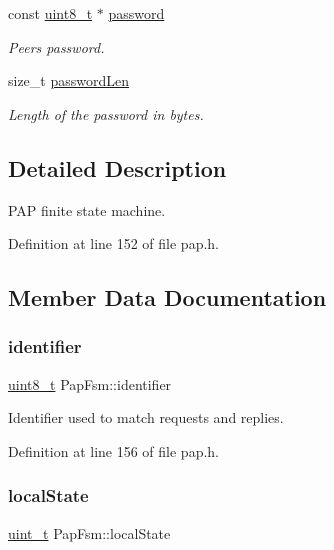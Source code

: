 \begin{DoxyCompactItemize}
const \hyperlink{stdint_8h_aba7bc1797add20fe3efdf37ced1182c5}{uint8\+\_\+t} $\ast$ \hyperlink{structPapFsm_ae09f94531c2c998e501561504c407aa3}{password}
\begin{DoxyCompactList}\small\item\em Peer\textquotesingle{}s password. \end{DoxyCompactList}\item 
size\+\_\+t \hyperlink{structPapFsm_aca5089d6f6410e1479038f36bb2232b7}{password\+Len}
\begin{DoxyCompactList}\small\item\em Length of the password in bytes. \end{DoxyCompactList}\end{DoxyCompactItemize}


\subsection{Detailed Description}
P\+AP finite state machine. 

Definition at line 152 of file pap.\+h.



\subsection{Member Data Documentation}
\mbox{\label{structPapFsm_af47e60588f579ffc9bb220a18af10340}} 
\subsubsection{\texorpdfstring{identifier}{identifier}}
{\footnotesize\ttfamily \hyperlink{stdint_8h_aba7bc1797add20fe3efdf37ced1182c5}{uint8\+\_\+t} Pap\+Fsm\+::identifier}



Identifier used to match requests and replies. 



Definition at line 156 of file pap.\+h.

\mbox{\label{structPapFsm_ae6b6b1e5a24606eda4669a0560174808}} 
\subsubsection{\texorpdfstring{local\+State}{localState}}
{\footnotesize\ttfamily \hyperlink{compiler__port_8h_a12a1e9b3ce141648783a82445d02b58d}{uint\+\_\+t} Pap\+Fsm\+::local\+State}




